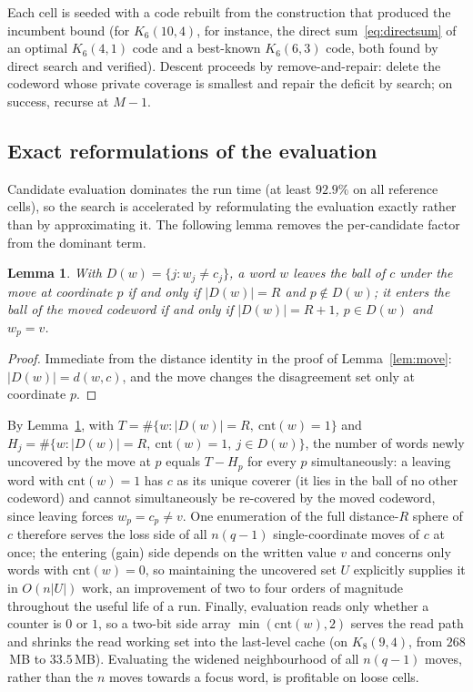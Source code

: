 \documentclass[11pt]{amsart}
\newtheorem{lemma}[theorem]{Lemma}
\newcommand{\Kq}[3]{K_{#1}(#2,#3)}
\begin{document}
Each cell is seeded with a code rebuilt from the construction that produced
the incumbent bound (for $\Kq{6}{10}{4}$, for instance, the direct
sum~\eqref{eq:directsum} of an optimal $\Kq{6}{4}{1}$ code and a
best-known $\Kq{6}{6}{3}$ code, both found by direct search and
verified). Descent proceeds by
remove-and-repair: delete the codeword whose private coverage is smallest
and repair the deficit by search; on success, recurse at $M-1$.

\subsection{Exact reformulations of the evaluation}\label{sec:engineering}

Candidate evaluation dominates the run time (at least $92.9\%$ on all
reference cells), so the search is accelerated by reformulating the
evaluation
exactly rather than by approximating it. The following lemma removes the
per-candidate factor from the dominant term.

\begin{lemma}\label{lem:shared}
With $D(w)=\{j: w_j\neq c_j\}$, a word $w$ leaves the ball of $c$ under the
move at coordinate $p$ if and only if $|D(w)|=R$ and $p\notin D(w)$; it
enters the ball of the moved codeword if and only if $|D(w)|=R+1$,
$p\in D(w)$ and $w_p=v$.
\end{lemma}

\begin{proof}
Immediate from the distance identity in the proof of
Lemma~\ref{lem:move}: $|D(w)|=d(w,c)$, and the move changes the
disagreement set only at coordinate $p$.
\end{proof}

By Lemma~\ref{lem:shared}, with
$T=\#\{w: |D(w)|=R,\ \mathrm{cnt}(w)=1\}$ and
$H_j=\#\{w: |D(w)|=R,\ \mathrm{cnt}(w)=1,\ j\in D(w)\}$, the number of
words newly uncovered by the move at $p$ equals $T-H_p$ for every $p$
simultaneously: a leaving word with $\mathrm{cnt}(w)=1$ has $c$ as its
unique coverer (it lies in the ball of no other codeword) and cannot
simultaneously be re-covered by the moved codeword, since leaving forces
$w_p=c_p\ne v$. One enumeration of the full distance-$R$ sphere of $c$
therefore serves the loss side of all $n(q-1)$ single-coordinate moves of
$c$ at once; the entering (gain) side depends on the written value $v$ and
concerns only words with $\mathrm{cnt}(w)=0$, so maintaining the uncovered
set $U$ explicitly supplies it in $O(n|U|)$ work, an improvement of
two to four orders of magnitude throughout the useful life of a run.
Finally, evaluation reads only whether a counter is $0$ or $1$, so a
two-bit side array $\min(\mathrm{cnt}(w),2)$ serves the read path and
shrinks the read working set into the last-level cache (on $\Kq{8}{9}{4}$,
from $268$\,MB to $33.5$\,MB). Evaluating the widened neighbourhood of all
$n(q-1)$ moves, rather than the $n$ moves towards a focus word, is
profitable on loose cells.
\end{document}
